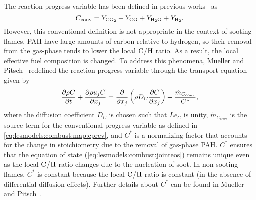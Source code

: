 The reaction progress variable has been defined in previous works~\cite{pierce2004,ihme2008} as
\begin{equation}\label{eq:lesmodels:combust:map:cprev}
  C_{\text{conv}} = Y_{\ce{CO2}} + Y_{\ce{CO}} + Y_{\ce{H2O}} + Y_{\ce{H2}}.
\end{equation}
However, this conventional definition is not appropriate in the context of sooting flames. PAH have large amounts of carbon relative to hydrogen, so their removal from the gas-phase tends to lower the local $\ce{C}$/$\ce{H}$ ratio. As a result, the local effective fuel composition is changed. To address this phenomena, Mueller and Pitsch~\cite{mueller2012} redefined the reaction progress variable through the transport equation given by
\begin{equation}\label{eq:lesmodels:combust:map:c}
  \trder{C} = \pder[]{x_j}\left( \rho D_C \pder[C]{x_j} \right) + \frac{\dot{m}_{C_{\text{conv}}}}{C^*},
\end{equation}
where the diffusion coefficient $D_C$ is chosen such that $Le_C$ is unity, $\dot{m}_{C_{\text{conv}}}$ is the source term for the conventional progress variable as defined in \cref{eq:lesmodels:combust:map:cprev}, and $C^*$ is a normalizing factor that accounts for the change in stoichiometry due to the removal of gas-phase PAH. $C^*$ ensures that the equation of state (\cref{eq:lesmodels:combust:jointeos}) remains unique even as the local $\ce{C}$/$\ce{H}$ ratio changes due to the nucleation of soot. In non-sooting flames, $C^*$ is constant because the local $\ce{C}$/$\ce{H}$ ratio is constant (in the absence of differential diffusion effects). Further details about $C^*$ can be found in Mueller and Pitsch~\cite{mueller2012}.


